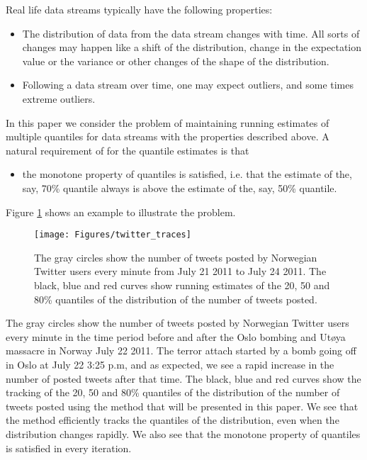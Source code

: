 \documentclass[10pt, a4paper]{article}
\newtheorem{rational for conjecture}{Rational for Conjecture}
\begin{document}
Real life data streams typically have the following properties:
\begin{itemize}
\item[1.] The distribution of data from the data stream changes with time. All sorts of changes may happen like a shift of the distribution, change in the expectation value or the variance or other changes of the shape of the distribution.
\item[2.] Following a data stream over time, one may expect outliers, and some times extreme outliers.
\end{itemize}
In this paper we consider the problem of maintaining running estimates of multiple quantiles for data streams with the properties described above. A natural requirement of for the quantile estimates is that
\begin{itemize}
\item[3.] the monotone property of quantiles is satisfied, i.e. that the estimate of the, say, 70\% quantile always is above the estimate of the, say, 50\% quantile. 
\end{itemize}


Figure \ref{fig:6} shows an example to illustrate the problem.
\begin{figure}[h]
  \centering
  \texttt{[image: Figures/twitter\_traces]}
  \caption{The gray circles show the number of tweets posted by Norwegian Twitter users every minute from July 21 2011 to July 24 2011. The black, blue and red curves show running estimates of the 20, 50 and 80\% quantiles of the distribution of the number of tweets posted.}
  \label{fig:6}
\end{figure}
The gray circles show the number of tweets posted by Norwegian Twitter users every minute in the time period before and after the Oslo bombing and Ut{\o}ya massacre in Norway July 22 2011. The terror attach started by a bomb going off in Oslo at July 22 3:25 p.m, and as expected, we see a rapid increase in the number of posted tweets after that time. The black, blue and red curves show the tracking of the 20, 50 and 80\% quantiles of the distribution of the number of tweets posted using the method that will be presented in this paper. We see that the method efficiently tracks the quantiles of the distribution, even when the distribution changes rapidly. We also see that the monotone property of quantiles is satisfied in every iteration.
\end{document}
